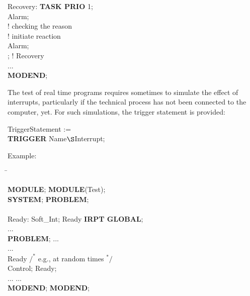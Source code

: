 \x Recovery: {\bf TASK PRIO} 1;\\
\x {} Alarm;\\
\x \x \x ! checking the reason\\
\x \x \x ! initiate reaction\\
\x {} Alarm;\\
\x {}; ! Recovery\\
\x ...\\
{\bf MODEND};

The test of real time programs requires sometimes to simulate the effect
of interrupts, particularly if the technical process has not been
connected to the computer, yet. For such simulations, the trigger
statement is provided:

TriggerStatement := \\
{\bf TRIGGER} Name$\S $Interrupt;

Example:

\begin{tabbing}
\hspace{6cm} \= \kill

{\bf MODULE};                 \> {\bf MODULE}(Test);\\
{\bf SYSTEM};                 \> {\bf PROBLEM};\\
         \> \\
\x Ready: Soft\_Int;          \>  Ready {\bf IRPT GLOBAL};\\
\x ...                        \> \\
{\bf PROBLEM};                \> \x ...\\
\x ...                        \> \\
 Ready           \> \x $/^*$ e.g., at random times $^*/$ \\
\x {} Control; \>  Ready;\\
\x ...                        \> \x ...\\
{\bf MODEND};                 \> {\bf MODEND};
\end{tabbing}

